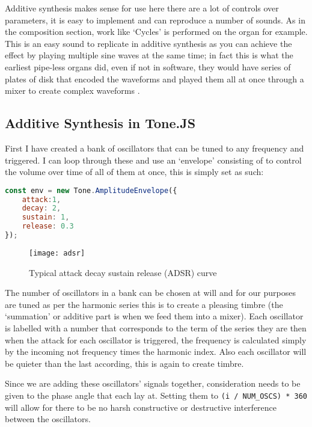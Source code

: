 Additive synthesis makes sense for use here there are a lot of controls over
parameters, it is easy to implement and can reproduce a number of sounds. As in
the composition section, work like `Cycles' is performed on the organ for
example. This is an easy sound to replicate in additive synthesis as you can
achieve the effect by playing multiple sine waves at the same time; in fact this
is what the earliest pipe-less organs did, even if not in software, they would
have series of plates of disk that encoded the waveforms and played them all at
once through a mixer to create complex waveforms \citep{10.2307/3680869}.

\subsection{Additive Synthesis in Tone.JS}
First I have created a bank of oscillators that can be tuned to any frequency
and triggered. I can loop through these and use an `envelope' consisting of to
control the volume over time of all of them at once, this is simply set as such:

\begin{lstlisting}[language=JavaScript]
const env = new Tone.AmplitudeEnvelope({
    attack:1,
    decay: 2,
    sustain: 1,
    release: 0.3
});
\end{lstlisting}

\begin{figure}[H]
    \centering
    \texttt{[image: adsr]}
    \caption{Typical attack decay sustain release (ADSR) curve}
\end{figure}

The number of oscillators in a bank can be chosen at will and for our purposes
are tuned as per the harmonic series this is to create a pleasing timbre (the
`summation' or additive part is when we feed them into a mixer). Each oscillator
is labelled with a number that corresponds to the term of the series they are
then when the attack for each oscillator is triggered, the frequency is
calculated simply by the incoming not frequency times the harmonic index. Also
each oscillator will be quieter than the last according, this is again to create
timbre.

Since we are adding these oscillators' signals together, consideration needs to
be given to the phase angle that each lay at. Setting them to \verb|(i / NUM_OSCS) * 360| 
will allow for there to be no harsh constructive or destructive interference
between the oscillators.


